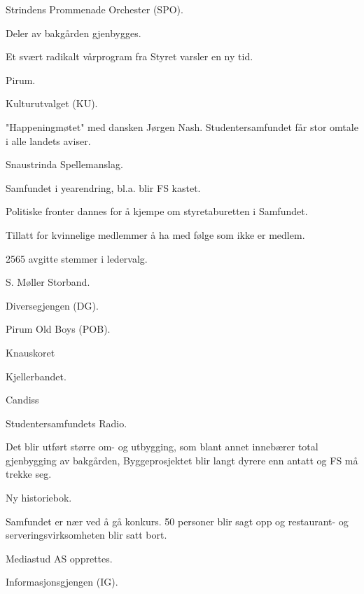   \item Strindens Prommenade Orchester (SPO).
  \item Deler av bakgården gjenbygges.
\yearend 

  \item Et svært radikalt vårprogram fra Styret varsler en ny tid.
  \item Pirum.
\yearend 

  \item Kulturutvalget (KU). 
\yearend 

  \item "Happeningmøtet" med dansken Jørgen Nash. Studentersamfundet får stor omtale i alle landets aviser.
  \item Snaustrinda Spellemanslag.
\yearend 

  \item Samfundet i yearendring, bl.a. blir FS kastet.
  \item Politiske fronter dannes for å kjempe om styretaburetten i Samfundet. 
\yearend 

  \item Tillatt for kvinnelige medlemmer å ha med følge som ikke er medlem.
\yearend 

  \item 2565 avgitte stemmer i ledervalg.
  \item S. Møller Storband.
\yearend 

  \item Diversegjengen (DG).
\yearend 

  \item Pirum Old Boys (POB).
  \item Knauskoret
  \item Kjellerbandet.
\yearend 

  \item Candiss
\yearend 

  \item Studentersamfundets Radio.
\yearend 

  \item Det blir utført større om- og utbygging, som blant annet innebærer total gjenbygging av bakgården,
Byggeprosjektet blir langt dyrere enn antatt og FS må trekke seg.
  \item Ny historiebok.
\yearend 

  \item Samfundet er nær ved å gå konkurs. 50 personer blir sagt opp og restaurant- og serveringsvirksomheten blir satt
bort.
  \item Mediastud AS opprettes.
  \item Informasjonsgjengen (IG). 
\yearend 

